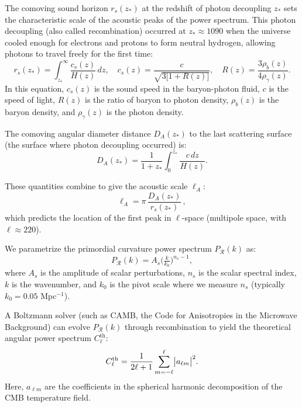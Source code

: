 \documentclass[11pt]{article}
\theoremstyle{definition}
\begin{document}
The comoving sound horizon $r_s(z_*)$ at the redshift of photon decoupling \(z_*\) sets the characteristic scale
of the acoustic peaks of the power spectrum. This photon decoupling (also called recombination) occurred at $z_* \approx 1090$ when the universe cooled enough for electrons and protons to form neutral hydrogen, allowing photons to travel freely for the first time:
\begin{equation}
  r_s(z_*) 
  = \int_{z_*}^\infty \frac{c_s(z)}{H(z)}\,dz,
  \quad
  c_s(z) = \frac{c}{\sqrt{3\bigl[1+R(z)\bigr]}},
  \quad
  R(z)=\frac{3\rho_b(z)}{4\rho_\gamma(z)}.
\end{equation}
In this equation, $c_s(z)$ is the sound speed in the baryon-photon fluid, $c$ is the speed of light, $R(z)$ is the ratio of baryon to photon density, $\rho_b(z)$ is the baryon density, and $\rho_\gamma(z)$ is the photon density.

The comoving angular diameter distance $D_A(z_*)$ to the last scattering surface (the surface where photon decoupling occurred) is:
\begin{equation}
  D_A(z_*) 
  = \frac{1}{1+z_*}\int_0^{z_*}\frac{c\,dz}{H(z)}.
\end{equation}

These quantities combine to give the acoustic scale $\ell_A$:
\begin{equation}
  \ell_A = \pi\,\frac{D_A(z_*)}{r_s(z_*)}\,,
\end{equation}
which predicts the location of the first peak in \(\ell\)-space (multipole space, with $\ell\approx 220$).

We parametrize the primordial curvature power spectrum $P_{\mathcal{R}}(k)$ as:
\begin{equation}
  P_{\mathcal R}(k)
  = A_s\bigl(\tfrac{k}{k_0}\bigr)^{n_s-1},
\end{equation}
where $A_s$ is the amplitude of scalar perturbations, $n_s$ is the scalar spectral index, $k$ is the wavenumber, and \(k_0\) is the pivot scale where we measure $n_s$ (typically $k_0 = 0.05$ Mpc$^{-1}$).

A Boltzmann solver (such as CAMB, the Code for Anisotropies in the Microwave Background) can evolve 
\(P_{\mathcal R}(k)\)
through recombination to yield the theoretical angular power spectrum $C_\ell^{\text{th}}$:
\begin{equation}
  C_\ell^{\rm th}
  = \frac{1}{2\ell+1}\sum_{m=-\ell}^{\ell}\bigl|a_{\ell m}\bigr|^2.
\end{equation}
Here, $a_{\ell m}$ are the coefficients in the spherical harmonic decomposition of the CMB temperature field.
\end{document}
